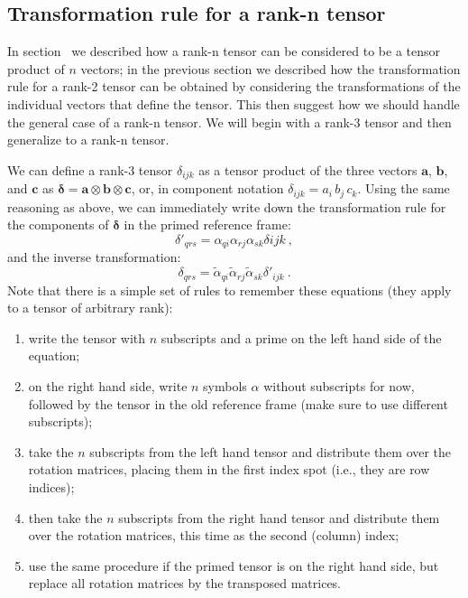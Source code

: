 \subsection{Transformation rule for a rank-n tensor}

In section~ we described how a rank-n tensor can be considered to be a tensor product of $n$ vectors; in the previous section we described how the transformation rule for a rank-2 tensor can be obtained by considering the transformations of the individual vectors that define the tensor. This then suggest how we should handle the general case of a rank-n tensor.  We will begin with a rank-3 tensor and then generalize to a rank-n tensor.

We can define a rank-3 tensor $\delta_{ijk}$ as a tensor product of the three vectors $\mathbf{a}$, $\mathbf{b}$, and $\mathbf{c}$ as $\bm{\delta} = \mathbf{a}\otimes\mathbf{b}\otimes\mathbf{c}$, or, in component notation $\delta_{ijk}=a_i\,b_j\,c_k$. Using the same reasoning as above, we can immediately write down the transformation rule for the components of $\bm{\delta}$ in the primed reference frame:
\begin{equation}
	\delta'_{qrs} = \alpha_{qi}\alpha_{rj}\alpha_{sk}\delta{ijk}\ ,
\end{equation}
and the inverse transformation:
\begin{equation}
	\delta_{qrs} = \tilde{\alpha}_{qi}\tilde{\alpha}_{rj}\tilde{\alpha}_{sk}\delta'_{ijk}\ .
\end{equation}
Note that there is a simple set of rules to remember these equations (they apply to a tensor of arbitrary rank):
\begin{enumerate}
	\item write the tensor with $n$ subscripts and a prime on the left hand side of the equation;
	\item on the right hand side, write $n$ symbols $\alpha$ without subscripts for now, followed by the tensor in the old reference frame (make sure to use different subscripts);
	\item take the $n$ subscripts from the left hand tensor and distribute them over the rotation matrices, placing them in the first index spot (i.e., they are row indices);
	\item then take the $n$ subscripts from the right hand tensor and distribute them over the rotation matrices, this time as the second (column) index;
	\item use the same procedure if the primed tensor is on the right hand side, but replace all rotation matrices by the transposed matrices.
\end{enumerate} 

